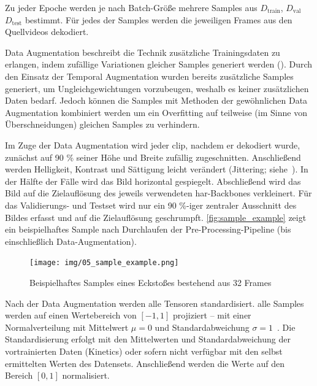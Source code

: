 Zu jeder Epoche werden je nach Batch-Größe mehrere Samples aus $D_{\text{train}}$, $D_\text{val}$ \bzw $D_\text{test}$ bestimmt.
Für jedes der Samples werden die jeweiligen Frames aus den Quellvideos dekodiert.

Data Augmentation beschreibt die Technik zusätzliche Trainingsdaten zu erlangen, indem zufällige Variationen gleicher Samples generiert werden (\cite{Gugger20}).
Durch den Einsatz der Temporal Augmentation wurden bereits zusätzliche Samples generiert, um Ungleichgewichtungen vorzubeugen, weshalb es keiner zusätzlichen Daten bedarf.
Jedoch können die Samples mit Methoden der gewöhnlichen Data Augmentation kombiniert werden um ein Overfitting auf teilweise (im Sinne von Überschneidungen) gleichen Samples zu verhindern.

Im Zuge der Data Augmentation wird jeder \gls{clip}, nachdem er dekodiert wurde, zunächst auf 90 \% seiner Höhe und Breite zufällig zugeschnitten.
Anschließend werden Helligkeit, Kontrast und Sättigung leicht verändert (Jittering; siehe~\cite{Tran18}).
In der Hälfte der Fälle wird das Bild horizontal gespiegelt.
Abschließend wird das Bild auf die Zielauflösung des jeweils verwendeten \gls{har}-Backbones verkleinert.
Für das Validierungs- und Testset wird nur ein 90 \%-iger zentraler Ausschnitt des Bildes erfasst und auf die Zielauflösung geschrumpft.
\autoref{fig:sample_example} zeigt ein beispielhaftes Sample nach Durchlaufen der Pre-Processing-Pipeline (bis einschließlich Data-Augmentation).

\begin{figure}
    \centering
    \texttt{[image: img/05\_sample\_example.png]}
    \caption{Beispielhaftes Samples eines Eckstoßes bestehend aus 32 Frames}
    \label{fig:sample_example}
\end{figure}

Nach der Data Augmentation werden alle Tensoren standardisiert.
\Dh alle Samples werden auf einen Wertebereich von $\left[ -1, 1\right]$ projiziert -- mit einer Normalverteilung mit Mittelwert $\mu = 0$ und Standardabweichung $\sigma = 1$~\cite{Burkov19}.
Die Standardisierung erfolgt mit den Mittelwerten und Standardabweichung der vortrainierten Daten (\zB Kinetics) oder sofern nicht verfügbar mit den selbst ermittelten Werten des Datensets.
Anschließend werden die Werte auf den Bereich $\left[0, 1\right]$ normalisiert.
